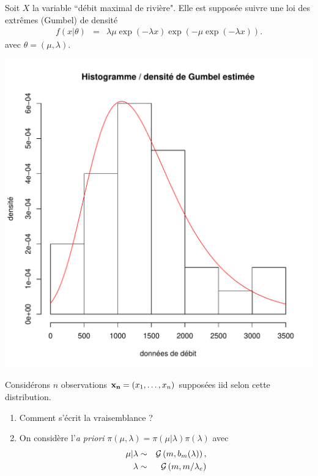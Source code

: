 \begin{exec}\label{debit.extreme}
Soit $X$ la variable ``débit maximal de rivière". Elle est supposée suivre une loi des extrêmes (Gumbel) de densité
\begin{eqnarray*}
f(x|\theta) & = &  \lambda\mu\exp(-\lambda x)
\exp(-\mu\exp(-\lambda x)).
\end{eqnarray*}
avec $\theta=(\mu,\lambda)$. %
\begin{center}
\includegraphics[scale=0.4]{figures/calcul/hist-gumbel.pdf}
\end{center}
Considérons $n$ observations ${\bf x_n}=(x_1,\ldots,x_n)$ supposées iid  selon cette distribution. 
\begin{enumerate}
    \item Comment s'écrit la vraisemblance ?
    \item On considère l'{\it a priori} $\pi(\mu,\lambda) = \pi(\mu|\lambda)\pi(\lambda)$ avec
\begin{eqnarray*}
\mu|\lambda & \sim   & {\cal{G}}\left(m,b_m(\lambda) \right),  \\
\lambda    & \sim   & {\cal{G}}\left(m,m/\lambda_e\right)

\end{eqnarray*}
\end{enumerate}
\end{exec}
